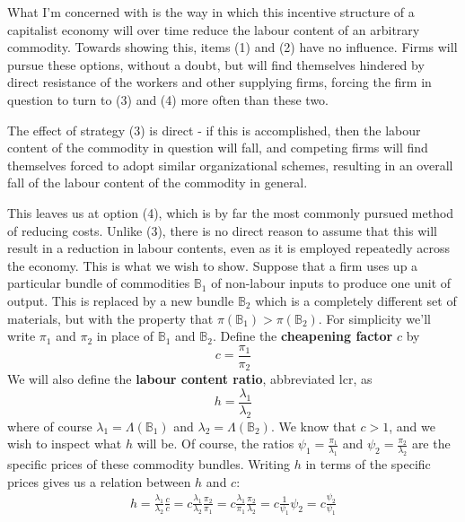 What I'm concerned with is the way in which this incentive structure of a capitalist economy will over time reduce the labour content of an arbitrary commodity. Towards showing this, items (1) and (2) have no influence. Firms will pursue these options, without a doubt, but will find themselves hindered by direct resistance of the workers and other supplying firms, forcing the firm in question to turn to (3) and (4) more often than these two. \par 
The effect of strategy (3) is direct - if this is accomplished, then the labour content of the commodity in question will fall, and competing firms will find themselves forced to adopt similar organizational schemes, resulting in an overall fall of the labour content of the commodity in general. \par 
This leaves us at option (4), which is by far the most commonly pursued method of reducing costs. Unlike (3), there is no direct reason to assume that this will result in a reduction in labour contents, even as it is employed repeatedly across the economy. This is what we wish to show. Suppose that a firm uses up a particular bundle of commodities $\mathbb{B}_1$ of non-labour inputs to produce one unit of output. This is replaced by a new bundle $\mathbb{B}_2$ which is a completely different set of materials, but with the property that $\pi(\mathbb{B}_1) > \pi(\mathbb{B}_2)$. For simplicity we'll write $\pi_1$ and $\pi_2$ in place of $\mathbb{B}_1$ and $\mathbb{B}_2$. Define the \textbf{cheapening factor} $c$ by
	\[ c = \frac{\pi_1}{\pi_2} \]
We will also define the \textbf{labour content ratio}, abbreviated lcr, as 
	\[ h = \frac{\lambda_1}{\lambda_2} \]
where of course $\lambda_1 = \Lambda(\mathbb{B}_1)$ and $\lambda_2 = \Lambda(\mathbb{B}_2)$. We know that $c > 1$, and we wish to inspect what $h$ will be. Of course, the ratios $\psi_1 = \frac{\pi_1}{\lambda_1}$ and $\psi_2 = \frac{\pi_2}{\lambda_2}$ are the specific prices of these commodity bundles. Writing $h$ in terms of the specific prices gives us a relation between $h$ and $c$:
\begin{align}
	h = \frac{\lambda_1}{\lambda_2} \frac{c}{c} = c \frac{\lambda_1}{\lambda_2} \frac{\pi_2}{\pi_1} = c \frac{\lambda_1}{\pi_1} \frac{\pi_2}{\lambda_2} = c \frac{1}{\psi_1} \psi_2 = c \frac{\psi_2}{\psi_1}
\end{align}
